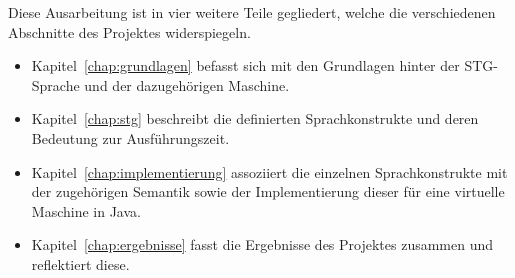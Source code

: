 Diese Ausarbeitung ist in vier weitere Teile gegliedert, welche die verschiedenen Abschnitte des Projektes widerspiegeln.

\begin{itemize}
\item Kapitel~\ref{chap:grundlagen} befasst sich mit den Grundlagen hinter der STG-Sprache und der dazugehörigen Maschine.

\item Kapitel~\ref{chap:stg} beschreibt die definierten Sprachkonstrukte und deren Bedeutung zur Ausführungszeit.

\item Kapitel~\ref{chap:implementierung} assoziiert die einzelnen Sprachkonstrukte mit der zugehörigen Semantik sowie der Implementierung dieser für eine virtuelle Maschine in Java.

\item Kapitel~\ref{chap:ergebnisse} fasst die Ergebnisse des Projektes zusammen und reflektiert diese.

\end{itemize}


